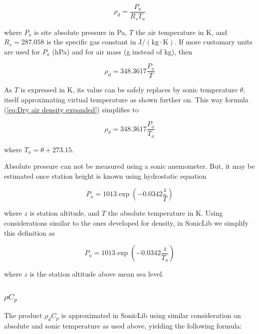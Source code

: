 \documentclass[a4paper,10pt]{book}
\begin{document}
\begin{equation}\label{eq:Dry air density}
 \rho_{d} = \frac{P_{a}}{R_{s} T_{a}}
\end{equation} 

\noindent where $P_{a}$ is site absolute pressure in Pa, $T$ the air temperature in K, and $R_{s} = 287.058$ is the specific gas constant in $\mbox{J}/(\mbox{kg}\cdot\mbox{K})$. If more customary units are used for $P_{a}$ (hPa) and for air mass (g instead of kg), then

\begin{equation}\label{eq:Dry air density expanded}
 \rho_{d} = 348.3617 \frac{P_{a}}{T}
\end{equation} 

As $T$ is expressed in K, its value can be safely replaces by sonic temperature $\theta$, itself approximating virtual temperature as shown further on. This way formula (\ref{eq:Dry air density expanded}) simplifies to

\begin{equation}\label{eq:Dry air density simplified}
 \rho_{d} = 348.3617 \frac{P_{a}}{T_{a}}
\end{equation} 

\noindent where $T_{a} = \theta + 273.15$.

Absolute pressure can not be measured using a sonic anemometer. But, it may be estimated once station height is known using hydrostatic equation

\begin{equation}\label{eq:Air pressure}
 P_{a} = 1013 \exp \left(-0.0342 \frac{z}{T} \right)
\end{equation} 

\noindent where $z$ is station altitude, and $T$ the absolute temperature in K. Using considerations similar to the ones developed for density, in SonicLib we simplify this definition as

\begin{equation}\label{eq:Air pressure simplified}
 P_{a} = 1013 \exp \left(-0.0342 \frac{z}{T_{a}} \right)
\end{equation} 

\noindent where $z$ is the station altitude above mean sea level.

\subsubsection{$\rho C_{p}$}

The product $\rho_{d} C_{p}$ is approximated in SonicLib using similar consideration on absolute and sonic temperature as used above, yielding the following formula:
\end{document}
